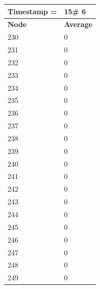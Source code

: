 \begin{tabular}{|l||l|}
\hline
\textbf{Timestamp =} & \textbf{15}\# 6\\\hline
	\textbf{Node} & \textbf{Average} \\ \hline
\hline
	230 & 0 \\ \hline
	231 & 0 \\ \hline
	232 & 0 \\ \hline
	233 & 0 \\ \hline
	234 & 0 \\ \hline
	235 & 0 \\ \hline
	236 & 0 \\ \hline
	237 & 0 \\ \hline
	238 & 0 \\ \hline
	239 & 0 \\ \hline
	240 & 0 \\ \hline
	241 & 0 \\ \hline
	242 & 0 \\ \hline
	243 & 0 \\ \hline
	244 & 0 \\ \hline
	245 & 0 \\ \hline
	246 & 0 \\ \hline
	247 & 0 \\ \hline
	248 & 0 \\ \hline
	249 & 0 \\ \hline
\end{tabular}

